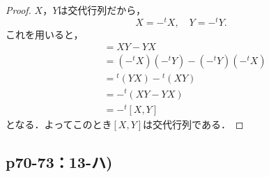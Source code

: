 \documentclass[uplatex,dvipdfmx,a4paper,11pt,fleqn]{jsarticle}
\begin{document}
\begin{tleftbar}
    \begin{proof}
        $X$，$Y$は交代行列だから，
        \[
          X=- {}^t X ,\quad Y = -{}^t Y .
        \]
        これを用いると，
        \begin{align*} 
            [X,Y] & = XY -YX \\
            & = (-{}^t X) (-{}^t Y) - (-{}^t Y)(-{}^t X) \\
            & = {}^t (YX) - {}^t (XY) \\
            & = -{}^t (XY-YX) \\
            & = -{}^t [X,Y]
        \end{align*} 
        となる．よってこのとき$[X,Y]$は交代行列である．
    \end{proof}
    \end{tleftbar}

\newpage 

    \subsection*{p70-73：13-ハ)}
\end{document}
